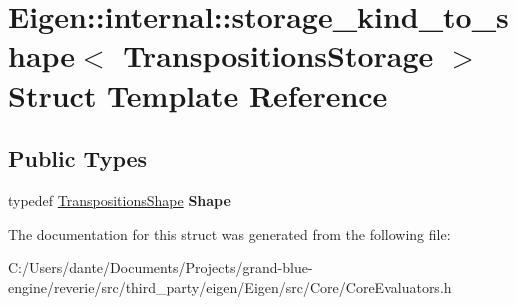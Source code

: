 \hypertarget{struct_eigen_1_1internal_1_1storage__kind__to__shape_3_01_transpositions_storage_01_4}{}\section{Eigen\+::internal\+::storage\+\_\+kind\+\_\+to\+\_\+shape$<$ Transpositions\+Storage $>$ Struct Template Reference}
\label{struct_eigen_1_1internal_1_1storage__kind__to__shape_3_01_transpositions_storage_01_4}
\subsection*{Public Types}
\begin{DoxyCompactItemize}
\item 
\mbox{\label{struct_eigen_1_1internal_1_1storage__kind__to__shape_3_01_transpositions_storage_01_4_a79020d45c66fd714785824d42432fb82}} 
typedef \mbox{\hyperlink{struct_eigen_1_1_transpositions_shape}{Transpositions\+Shape}} {\bfseries Shape}
\end{DoxyCompactItemize}


The documentation for this struct was generated from the following file\+:\begin{DoxyCompactItemize}
\item 
C\+:/\+Users/dante/\+Documents/\+Projects/grand-\/blue-\/engine/reverie/src/third\+\_\+party/eigen/\+Eigen/src/\+Core/Core\+Evaluators.\+h\end{DoxyCompactItemize}
